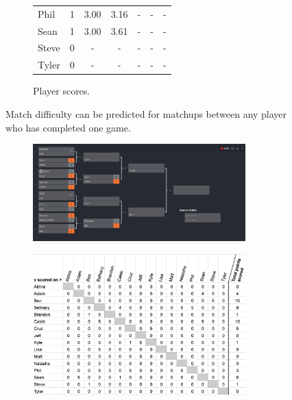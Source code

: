 \documentclass[letterpaper, 10 pt, conference]{ieeeconf}  %
\begin{document}
\begin{figure}[h!b]
\begin{subfigure}[hb]{0.4\textwidth}
\begin{tabular}{lccc|ccc}
                        Phil	& 1	& 3.00	& 3.16 & - & - & - \\
                        Sean	& 1	& 3.00	& 3.61 & - & - & - \\
                        Steve	& 0	& -  	& -    & - & - & - \\
                        Tyler	& 0	& -  	& -    & - & - & - \\
                        \bottomrule
                \end{tabular}
                \caption{Player scores.}
        \end{subfigure}
        \caption{Match difficulty can be predicted for matchups between 
                 any player who has completed one game.}
\end{figure}

\begin{figure}[h!b]
        \centering
        \begin{subfigure}[ht]{0.5\textwidth}
                \centering
                \includegraphics[width=0.9\textwidth]{fig/singles-bracket_3.png}
        \end{subfigure}
        \begin{subfigure}[ht]{0.4\textwidth}
                \centering
                \includegraphics[width=0.9\textwidth]{fig/score-matrix_3.png}

\end{subfigure}
\end{figure}
\end{document}
